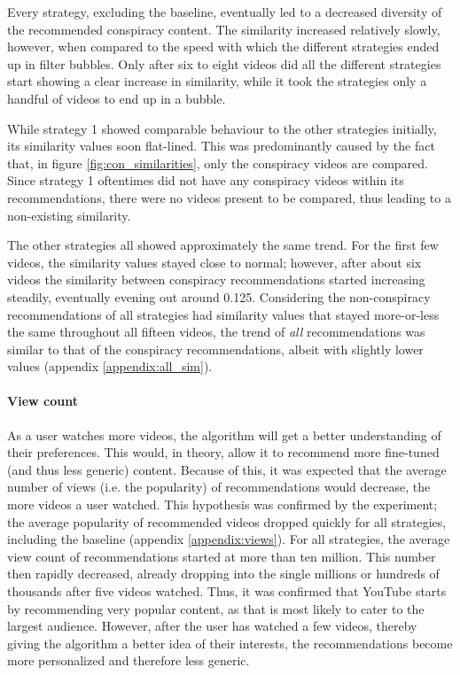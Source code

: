 \documentclass[../main.tex]{subfiles}
\begin{document}
Every strategy, excluding the baseline, eventually led to a decreased diversity of the recommended conspiracy 
content. The similarity increased relatively slowly, however, when compared to the speed with which the 
different strategies ended up in filter bubbles. Only after six to eight videos did all the different 
strategies start showing a clear increase in similarity, while it took the strategies only a handful of videos to end
up in a bubble.

While strategy 1 showed comparable behaviour to the other strategies initially, its similarity values soon 
flat-lined. This was predominantly caused by the fact that, in figure \ref{fig:con_similarities}, only the 
conspiracy videos are compared. Since strategy 1 oftentimes did not have any conspiracy videos within its 
recommendations, there were no videos present to be compared, thus leading to a non-existing similarity. 

The other strategies all showed approximately the same trend. For the first few videos, the similarity values 
stayed close to normal; however, after about six videos the similarity between conspiracy recommendations 
started increasing steadily, eventually evening out around 0.125. Considering the non-conspiracy recommendations
of all strategies had similarity values that stayed more-or-less the same throughout all fifteen videos, the 
trend of \textit{all} recommendations was similar to that of the conspiracy recommendations, albeit with 
slightly lower values (appendix \ref{appendix:all_sim}).

\paragraph{View count}
As a user watches more videos, the algorithm will get a better understanding of their preferences. This would, 
in theory, allow it to recommend more fine-tuned (and thus less generic) content. Because of this, it was 
expected that the average number of views (i.e. the popularity) of recommendations would decrease, the more 
videos a user watched. This hypothesis was confirmed by the experiment; the average popularity of recommended
videos dropped quickly for all strategies, including the baseline (appendix \ref{appendix:views}). For all
strategies, the average view count of recommendations started at more than ten million. This number then rapidly
decreased, already dropping into the single millions or hundreds of thousands after five videos watched. Thus,
it was confirmed that YouTube starts by recommending very popular content, as that is most likely to cater to
the largest audience. However, after the user has watched a few videos, thereby giving the algorithm a better
idea of their interests, the recommendations become more personalized and therefore less generic. 
\end{document}
